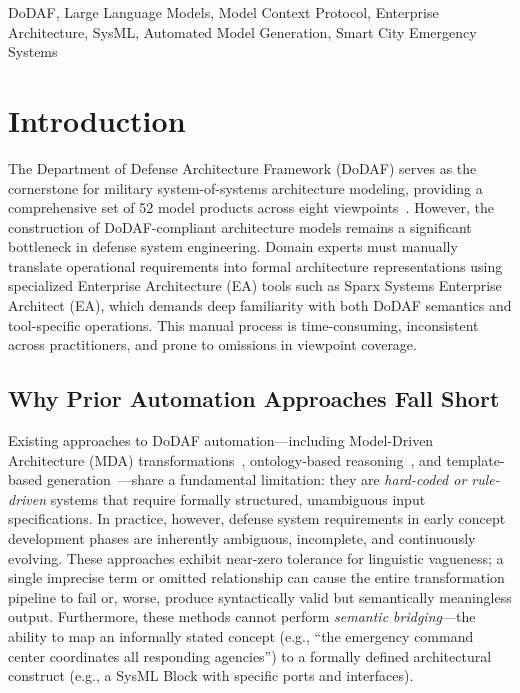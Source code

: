 \documentclass{ieeeaccess}
\begin{document}
\begin{IEEEkeywords}
DoDAF, Large Language Models, Model Context Protocol, Enterprise Architecture, SysML, Automated Model Generation, Smart City Emergency Systems
\end{IEEEkeywords}

\maketitle

\section{Introduction}
\label{sec:introduction}

The Department of Defense Architecture Framework (DoDAF) serves as the cornerstone for military system-of-systems architecture modeling, providing a comprehensive set of 52 model products across eight viewpoints~\cite{DoDAF2010}. However, the construction of DoDAF-compliant architecture models remains a significant bottleneck in defense system engineering. Domain experts must manually translate operational requirements into formal architecture representations using specialized Enterprise Architecture (EA) tools such as Sparx Systems Enterprise Architect (EA), which demands deep familiarity with both DoDAF semantics and tool-specific operations. This manual process is time-consuming, inconsistent across practitioners, and prone to omissions in viewpoint coverage.

\subsection{Why Prior Automation Approaches Fall Short}

Existing approaches to DoDAF automation---including Model-Driven Architecture (MDA) transformations~\cite{mda_dodaf}, ontology-based reasoning~\cite{ontology_dodaf}, and template-based generation~\cite{template_dodaf}---share a fundamental limitation: they are \emph{hard-coded or rule-driven} systems that require formally structured, unambiguous input specifications. In practice, however, defense system requirements in early concept development phases are inherently ambiguous, incomplete, and continuously evolving. These approaches exhibit near-zero tolerance for linguistic vagueness; a single imprecise term or omitted relationship can cause the entire transformation pipeline to fail or, worse, produce syntactically valid but semantically meaningless output. Furthermore, these methods cannot perform \emph{semantic bridging}---the ability to map an informally stated concept (e.g., ``the emergency command center coordinates all responding agencies'') to a formally defined architectural construct (e.g., a SysML Block with specific ports and interfaces).
\end{document}
